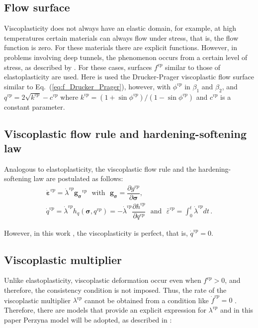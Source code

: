 \documentclass[Journal,letterpaper]{ascelike-new}
\newcommand{\dgds}{\boldsymbol{g_\sigma}}
\newcommand{\dstrainv}{\boldsymbol{\dot{\varepsilon}}^{vp}}
\newcommand{\hl}{{h_q}}
\newcommand{\strainvpeq}{\bar \varepsilon^{vp}}
\newcommand{\stress}{\boldsymbol{\sigma}}
\begin{document}
\subsection{Flow surface}

Viscoplasticity does not always have an elastic domain, for example, at high temperatures certain materials can always flow under stress, that is, the flow function is zero. For these materials there are explicit functions. However, in problems involving deep tunnels, the phenomenon occurs from a certain level of stress, as described by . For these cases, surfaces $f^{vp}$ similar to those of elastoplasticity are used. Here is used the Drucker-Prager viscoplastic flow surface similar to Eq.~(\ref{eq:f_Drucker_Prager}), however, with $\phi^{vp}$ in $\beta_1$ and $\beta_2$, and $q^{vp} = 2\sqrt{k^{vp}}-c^{vp}$ where $k^{vp} = (1+\sin{\phi^{vp}})/(1-\sin{\phi^{vp}})$ and $c^{vp}$ is a constant parameter.

\subsection{Viscoplastic flow rule and hardening-softening law}

Analogous to elastoplasticity, the viscoplastic flow rule and the hardening-softening law are postulated as follows:
\begin{equation} \label{eq_plastic_flow_rule}
	\begin{array}{lcl}
		\dstrainv = \dot \lambda^{vp} \dgds^{vp} ~~~ \text{with} ~~~ \dgds = \dfrac{\partial g^{vp}}{\partial \stress}, \\ 
		\dot q^{vp} = \dot \lambda^{vp} \hl(\stress,q^{vp}) = - \dot \lambda^{vp} \dfrac{\partial h^{vp}}{\partial q^{vp}} ~~~\text{and} ~~~ \strainvpeq = \int_{0}^{t} \dot \lambda^{vp} dt  \,.
	\end{array}
\end{equation}

However, in this work , the viscoplasticity is perfect, that is, $\dot q^{vp} = 0$.

\subsection{Viscoplastic multiplier}

Unlike elastoplasticity, viscoplastic deformation occur even when $f^{vp} > 0$, and therefore, the consistency condition is not imposed. Thus, the rate of the viscoplastic multiplier $\lambda^{vp}$ cannot be obtained from a condition like $\dot f^{vp} = 0$ . Therefore, there are models that provide an explicit expression for $\lambda^{vp}$ and in this paper Perzyna model \cite{perzyna1966} will be adopted, as described in :
\end{document}
